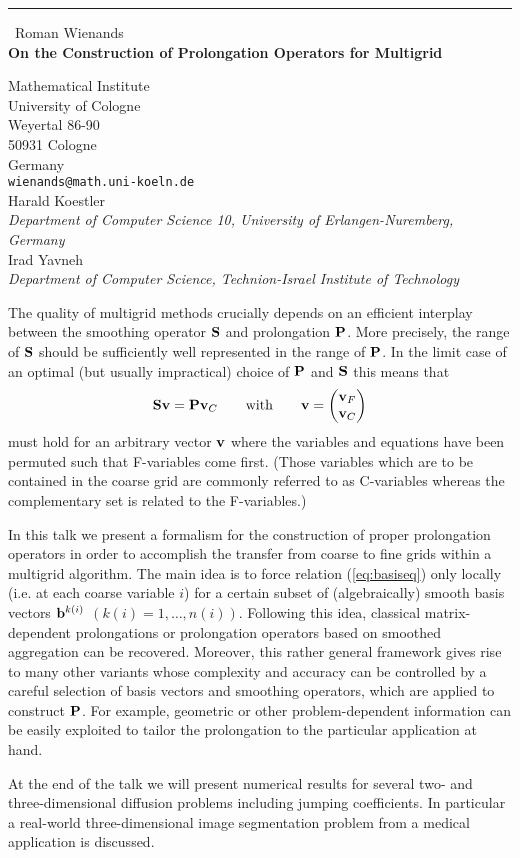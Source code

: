 \documentclass{report}
\begin{document}
\begin{center}
\rule{6in}{1pt} \
{\large Roman Wienands \\
{\bf On the Construction of Prolongation Operators for Multigrid}}

Mathematical Institute \\ University of Cologne \\ Weyertal 86-90 \\ 50931 Cologne \\ Germany
\\
{\tt wienands@math.uni-koeln.de}\\
Harald Koestler\\
{\em Department of Computer Science 10, University of Erlangen-Nuremberg, Germany}\\
Irad Yavneh\\
{\em Department of Computer Science, Technion-Israel Institute of Technology}\end{center}

\def\bfP{{\bf P}}
\def\bfS{{\bf S}}
\def\bfv{{\bf v}}
\def\bfb{{\bf b}}
The quality of multigrid methods crucially depends on an efficient
interplay between the smoothing operator $\bfS$ and prolongation $\bfP$.
More precisely, the range of $\bfS$ should be sufficiently well
represented in the range of $\bfP$. In the limit case of an optimal (but
usually impractical) choice of $\bfP$ and $\bfS$ this means that
\begin{equation}
\bfS \bfv = \bfP \bfv_{C} \qquad \text{with}
\qquad \bfv = \left( \begin{matrix} \bfv_{F} \\ \bfv_{C}
\end{matrix} \right) \label{eq:basiseq}
\end{equation}
must hold for an arbitrary vector $\bfv$ where the variables and
equations have been permuted such that F-variables come first.
(Those variables which are to be contained in the coarse grid are
commonly referred to as C-variables whereas the complementary set is
related to the F-variables.)

In this talk we present a formalism for the construction of proper
prolongation operators in order to accomplish the transfer from coarse to
fine grids within a multigrid algorithm. The main idea is to force
relation
(\ref{eq:basiseq}) only locally (i.e. at each coarse variable $i$) for a
certain subset of (algebraically) smooth basis vectors $\bfb^{k(i)}$
$(k(i) = 1,\dots,n(i))$. Following this
idea, classical matrix-dependent prolongations or prolongation
operators based on smoothed aggregation can be recovered. Moreover, this
rather general framework gives rise to many other variants whose
complexity and accuracy can be controlled by a careful selection of basis
vectors and smoothing operators, which are applied to construct $\bfP$.
For example, geometric or other problem-dependent information can be
easily exploited to tailor the prolongation to the particular application
at hand.

At the end of the talk we will present numerical results for several two-
and three-dimensional diffusion problems including jumping coefficients.
In particular a real-world three-dimensional image segmentation problem
from a medical application is discussed.
\end{document}
